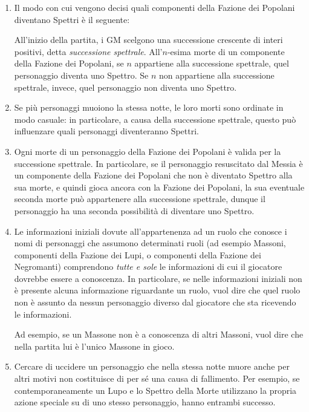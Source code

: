\documentclass[a4paper,10pt]{article}
\begin{document}
\begin{enumerate}
	\item Il modo con cui vengono decisi quali componenti della Fazione dei Popolani diventano Spettri è il seguente:
	
	All'inizio della partita, i GM scelgono una successione crescente di interi positivi, detta \emph{successione spettrale}. All'$n$-esima morte di un componente della Fazione dei Popolani, se $n$ appartiene alla successione spettrale, quel personaggio diventa uno Spettro. Se $n$ non appartiene alla successione spettrale, invece, quel personaggio non diventa uno Spettro.
	
	\item Se più personaggi muoiono la stessa notte, le loro morti sono ordinate in modo casuale: in particolare, a causa della successione spettrale, questo può influenzare quali personaggi diventeranno Spettri.
	
	\item Ogni morte di un personaggio della Fazione dei Popolani è valida per la successione spettrale. In particolare, se il personaggio resuscitato dal Messia è un componente della Fazione dei Popolani che non è diventato Spettro alla sua morte, e quindi gioca ancora con la Fazione dei Popolani, la sua eventuale seconda morte può appartenere alla successione spettrale, dunque il personaggio ha una seconda possibilità di diventare uno Spettro.
	
	\item Le informazioni iniziali dovute all'appartenenza ad un ruolo che conosce i nomi di personaggi che assumono determinati ruoli (ad esempio Massoni, componenti della Fazione dei Lupi, o componenti della Fazione dei Negromanti) comprendono \emph{tutte e sole} le informazioni di cui il giocatore dovrebbe essere a conoscenza. In particolare, se nelle informazioni iniziali non è presente alcuna informazione riguardante un ruolo, vuol dire che quel ruolo non è assunto da nessun personaggio diverso dal giocatore che sta ricevendo le informazioni.
	
	Ad esempio, se un Massone non è a conoscenza di altri Massoni, vuol dire che nella partita lui è l'unico Massone in gioco.
	
	\item Cercare di uccidere un personaggio che nella stessa notte muore anche per altri motivi non costituisce di per sé una causa di fallimento.
	Per esempio, se contemporaneamente un Lupo e lo Spettro della Morte utilizzano la propria azione speciale su di uno stesso personaggio, hanno entrambi successo.
	

\end{enumerate}
\end{document}
